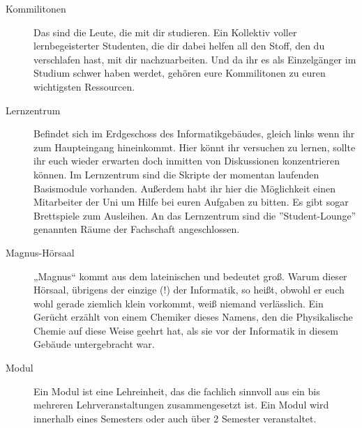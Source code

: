 \begin{description}
\item[Kommilitonen] Das sind die Leute, die mit dir studieren. Ein Kollektiv
voller lernbegeisterter Studenten, die dir dabei helfen all den Stoff, den du
verschlafen hast, mit dir nachzuarbeiten. Und da ihr es als Einzelgänger im
Studium schwer haben werdet, gehören eure Kommilitonen zu euren wichtigsten
Ressourcen.

\item[Lernzentrum] Befindet sich im Erdgeschoss des
Informatikgebäudes, gleich links wenn ihr zum Haupteingang
hineinkommt. Hier könnt ihr versuchen zu lernen, sollte ihr euch
wieder erwarten doch inmitten von Diskussionen konzentrieren können.
Im Lernzentrum sind die Skripte der momentan laufenden Basismodule
vorhanden. Außerdem habt ihr hier die Möglichkeit einen Mitarbeiter
der Uni um Hilfe bei euren Aufgaben zu bitten. Es gibt sogar
Brettspiele zum Ausleihen. An das Lernzentrum sind die
''Student-Lounge'' genannten Räume der Fachschaft angeschlossen.




\item[Magnus-Hörsaal] „Magnus“ kommt aus dem lateinischen und bedeutet
groß. Warum dieser Hörsaal, übrigens der einzige (!) der Informatik,
so heißt, obwohl er euch wohl gerade ziemlich klein vorkommt, weiß
niemand verlässlich. Ein Gerücht erzählt von einem Chemiker dieses
Namens, den die Physikalische Chemie auf diese Weise geehrt hat, als
sie vor der Informatik in diesem Gebäude untergebracht war.



\item[Modul] Ein Modul ist eine Lehreinheit, das die fachlich sinnvoll
aus ein bis mehreren Lehrveranstaltungen zusammengesetzt ist. Ein
Modul wird innerhalb eines Semesters oder auch über 2 Semester
veranstaltet.



\end{description}

